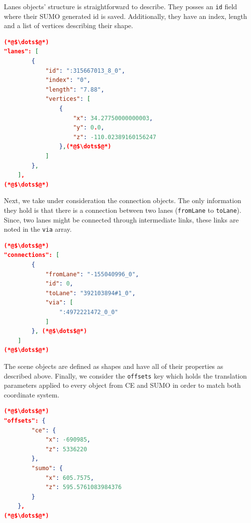 Lanes objects' structure is straightforward to describe. They posses an \texttt{id} field where their SUMO generated id is saved. Additionally, they have an index, length and a list of vertices describing their shape.\\
 
\begin{scriptsize}
        \begin{lstlisting}[language=json,firstnumber=1,caption={General overview of the lanes key in the JSON export format.},label={lis:format-node}]
(*@$\dots$@*)
"lanes": [
        {
            "id": ":315667013_8_0",
            "index": "0",
            "length": "7.88",
            "vertices": [
                {
                    "x": 34.27750000000003,
                    "y": 0.0,
                    "z": -110.02389160156247
                },(*@$\dots$@*)
            ]
        },
    ],
(*@$\dots$@*)
	   \end{lstlisting}
    \end{scriptsize}
    
Next, we take under consideration the connection objects. The only information they hold is that there is a connection between two lanes (\texttt{fromLane} to \texttt{toLane}). Since, two lanes might be connected through intermediate links, these links are noted in the \texttt{via} array.\\
    
    \begin{scriptsize}
        \begin{lstlisting}[language=json,firstnumber=1,caption={General overview of the connection key in the JSON export format.},label={lis:format-node}]
(*@$\dots$@*)
"connections": [
        {
            "fromLane": "-155040996_0",
            "id": 0,
            "toLane": "392103894#1_0",
            "via": [
                ":4972221472_0_0"
            ]
        }, (*@$\dots$@*)
    ]
(*@$\dots$@*)
	   \end{lstlisting}
    \end{scriptsize}
    
The scene objects are defined as shapes and have all of their properties as described above. Finally, we consider the \texttt{offsets} key which holds the translation parameters applied to every object from CE and SUMO in order to match both coordinate system. \\

    \begin{scriptsize}
        \begin{lstlisting}[language=json,firstnumber=1,caption={General overview of the offsets key in the JSON export format.},label={lis:format-node}]
(*@$\dots$@*)
"offsets": {
        "ce": {
            "x": -690985,
            "z": 5336220
        },
        "sumo": {
            "x": 605.7575,
            "z": 595.5761083984376
        }
    },
(*@$\dots$@*)
	   \end{lstlisting}
    \end{scriptsize}
    
